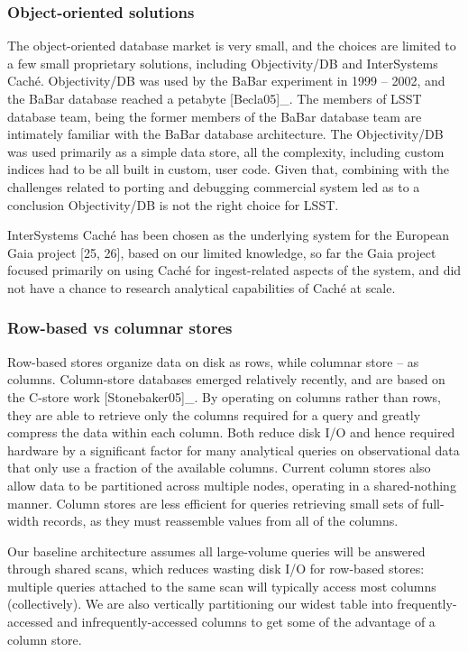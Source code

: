 \documentclass[DM,lsstdraft,toc]{lsstdoc}
\begin{document}
\subsubsection{Object-oriented
solutions}\label{object-oriented-solutions}

The object-oriented database market is very small, and the choices are
limited to a few small proprietary solutions, including Objectivity/DB
and InterSystems Caché. Objectivity/DB was used by the BaBar experiment
in 1999 -- 2002, and the BaBar database reached a petabyte
{[}Becla05{]}\_. The members of LSST database team, being the former
members of the BaBar database team are intimately familiar with the
BaBar database architecture. The Objectivity/DB was used primarily as a
simple data store, all the complexity, including custom indices had to
be all built in custom, user code. Given that, combining with the
challenges related to porting and debugging commercial system led as to
a conclusion Objectivity/DB is not the right choice for LSST.

InterSystems Caché has been chosen as the underlying system for the
European Gaia project {[}25, 26{]}, based on our limited knowledge, so
far the Gaia project focused primarily on using Caché for ingest-related
aspects of the system, and did not have a chance to research analytical
capabilities of Caché at scale.

\subsubsection{Row-based vs columnar
stores}\label{row-based-vs-columnar-stores}

Row-based stores organize data on disk as rows, while columnar store --
as columns. Column-store databases emerged relatively recently, and are
based on the C-store work {[}Stonebaker05{]}\_. By operating on columns
rather than rows, they are able to retrieve only the columns required
for a query and greatly compress the data within each column. Both
reduce disk I/O and hence required hardware by a significant factor for
many analytical queries on observational data that only use a fraction
of the available columns. Current column stores also allow data to be
partitioned across multiple nodes, operating in a shared-nothing manner.
Column stores are less efficient for queries retrieving small sets of
full-width records, as they must reassemble values from all of the
columns.

Our baseline architecture assumes all large-volume queries will be
answered through shared scans, which reduces wasting disk I/O for
row-based stores: multiple queries attached to the same scan will
typically access most columns (collectively). We are also vertically
partitioning our widest table into frequently-accessed and
infrequently-accessed columns to get some of the advantage of a column
store.
\end{document}

